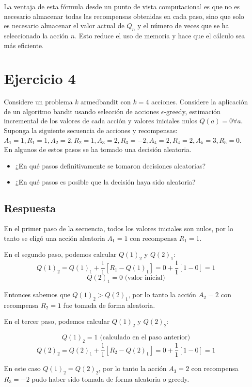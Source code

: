 \documentclass[12pt,a4paper]{article}
\begin{document}
La ventaja de esta fórmula desde un punto de vista computacional es que no es necesario almacenar
todas las recompensas obtenidas en cada paso, sino que solo es necesario almacenar el valor
actual de $Q_n$ y el número de veces que se ha seleccionado la acción $n$. Esto reduce
el uso de memoria y hace que el cálculo sea más eficiente.

\section{Ejercicio 4}

Considere un problema $k$ armedbandit con $k=4$ acciones. Considere la aplicación de 
un algoritmo bandit usando selección de acciones $\epsilon$-greedy, estimación incremental de los valores 
de cada acción y valores iniciales nulos $Q(a)= 0 \forall a$. Suponga la siguiente secuencia de acciones y 
recompensas: $A_1=1,R_1=1, A_2=2,R_2=1, A_3=2,R_3=-2, A_4=2,R_4=2, A_5=3,R_5=0$. En algunos de estos pasos se ha 
tomado una decisión aleatoria. 
\begin{itemize}
 \item ¿En qué pasos definitivamente se tomaron decisiones aleatorias?
 \item ¿En qué pasos es posible que la decisión haya sido aleatoria?
\end{itemize}

\subsection{Respuesta}

En el primer paso de la secuencia, todos los valores iniciales son nulos, por lo tanto se eligó una acción aleatoria
$A_1=1$ con recompensa $R_1=1$.

En el segundo paso, podemos calcular $Q(1)_2$ y $Q(2)_1$:
$$ Q(1)_2 = Q(1)_1 + \frac{1}{1}[R_1 - Q(1)_1] = 0 + \frac{1}{1}[1 - 0] = 1 $$
$$ Q(2)_1 = 0 \text{ (valor inicial)} $$

Entonces sabemos que $Q(1)_2 > Q(2)_1$, por lo tanto la acción $A_2=2$ con recompensa $R_2=1$ fue tomada de forma aleatoria.

En el tercer paso, podemos calcular $Q(1)_2$ y $Q(2)_2$:

$$ Q(1)_2 = 1 \text{ (calculado en el paso anterior)} $$
$$ Q(2)_2 = Q(2)_1 + \frac{1}{1}[R_2 - Q(2)_1] = 0 + \frac{1}{1}[1 - 0] = 1 $$

En este caso $Q(1)_2 = Q(2)_2$, por lo tanto la acción $A_3=2$ con recompensa $R_3=-2$
pudo haber sido tomada de forma aleatoria o greedy.
\end{document}
